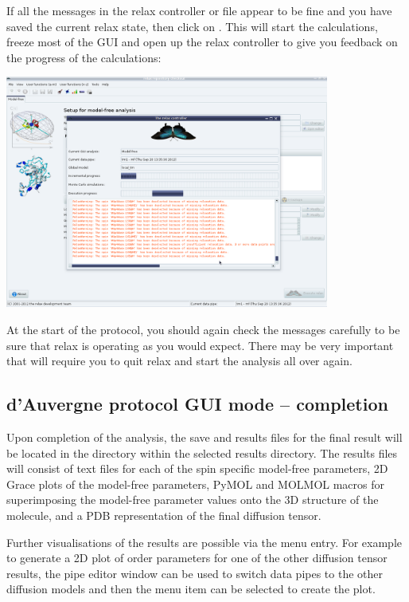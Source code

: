 \begin{htmlonly}
\begin{htmlonly}
If all the messages in the relax controller or  file appear to be fine and you have saved the current relax state, then click on .  This will start the calculations, freeze most of the GUI and open up the relax controller to give you feedback on the progress of the calculations:

\begin{minipage}[h]{\linewidth}
\centerline{\includegraphics[width=0.8\textwidth, bb=14 14 1415 1019]{graphics/screenshots/mf_analysis/relax_controller_executing}}
\end{minipage}

At the start of the protocol, you should again check the messages carefully to be sure that relax is operating as you would expect.  There may be very important  that will require you to quit relax and start the analysis all over again.


\subsection{d'Auvergne protocol GUI mode -- completion}

Upon completion of the analysis, the save and results files for the final result will be located in the  directory within the selected results directory.  The results files will consist of text files for each of the spin specific model-free parameters, 2D Grace plots of the model-free parameters, PyMOL and MOLMOL macros for superimposing the model-free parameter values onto the 3D structure of the molecule, and a PDB representation of the final diffusion tensor.

Further visualisations of the results are possible via the  menu entry.  For example to generate a 2D plot of order parameters for one of the other diffusion tensor results, the pipe editor window can be used to switch data pipes to the other diffusion models and then the  menu item can be selected to create the plot.



\end{htmlonly}
\end{htmlonly}
